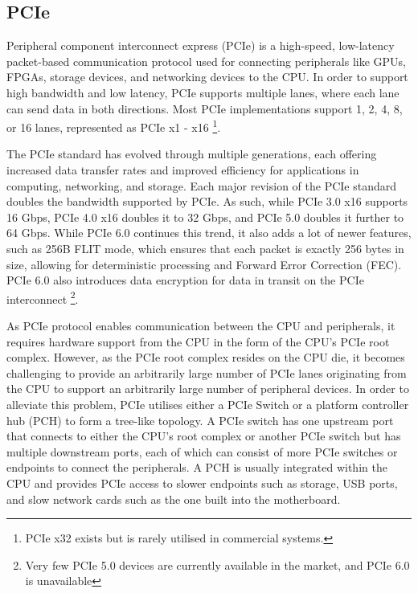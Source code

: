 \subsection{PCIe}
\label{subsec:interconnect-sc-background-pcie}

Peripheral component interconnect express (PCIe) is a high-speed, low-latency packet-based communication protocol used for connecting peripherals like GPUs, FPGAs, storage devices, and networking devices to the CPU. 
In order to support high bandwidth and low latency, PCIe supports multiple lanes, where each lane can send data in both directions.
Most PCIe implementations support 1, 2, 4, 8, or 16 lanes, represented as PCIe x1 - x16
\footnote{PCIe x32 exists but is rarely utilised in commercial systems.}.

The PCIe standard has evolved through multiple generations, each offering increased data transfer rates and improved efficiency for applications in computing, networking, and storage.
Each major revision of the PCIe standard doubles the bandwidth supported by PCIe.
As such, while PCIe 3.0 x16 supports 16 Gbps, PCIe 4.0 x16 doubles it to 32 Gbps, and PCIe 5.0 doubles it further to 64 Gbps.
While PCIe 6.0 continues this trend, it also adds a lot of newer features, such as 256B FLIT mode, which ensures that each packet is exactly 256 bytes in size, allowing for deterministic processing and Forward Error Correction (FEC).
PCIe 6.0 also introduces data encryption for data in transit on the PCIe interconnect
\footnote{Very few PCIe 5.0 devices are currently available in the market, and PCIe 6.0 is unavailable}.

As PCIe protocol enables communication between the CPU and peripherals, it requires hardware support from the CPU in the form of the CPU's PCIe root complex.
However, as the PCIe root complex resides on the CPU die, it becomes challenging to provide an arbitrarily large number of PCIe lanes originating from the CPU to support an arbitrarily large number of peripheral devices.
In order to alleviate this problem, PCIe utilises either a PCIe Switch or a platform controller hub (PCH) to form a tree-like topology.
A PCIe switch has one upstream port that connects to either the CPU's root complex or another PCIe switch but has multiple downstream ports, each of which can consist of more PCIe switches or endpoints to connect the peripherals.
A PCH is usually integrated within the CPU and provides PCIe access to slower endpoints such as storage, USB ports, and slow network cards such as the one built into the motherboard.

